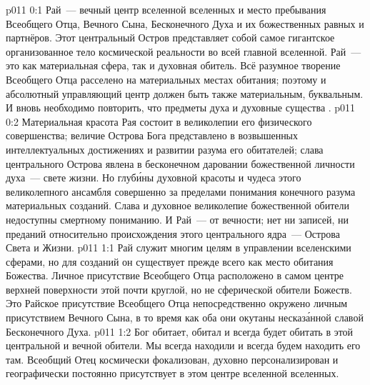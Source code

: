 \author{Совершенствователь Мудрости}
\vs p011 0:1 Рай~--- вечный центр вселенной вселенных и место пребывания Всеобщего Отца, Вечного Сына, Бесконечного Духа и их божественных равных и партнёров. Этот центральный Остров представляет собой самое гигантское организованное тело космической реальности во всей главной вселенной. Рай~--- это как материальная сфера, так и духовная обитель. Всё разумное творение Всеобщего Отца расселено на материальных местах обитания; поэтому и абсолютный управляющий центр должен быть также материальным, буквальным. И вновь необходимо повторить, что предметы духа и духовные существа .
\vs p011 0:2 Материальная красота Рая состоит в великолепии его физического совершенства; величие Острова Бога представлено в возвышенных интеллектуальных достижениях и развитии разума его обитателей; слава центрального Острова явлена в бесконечном даровании божественной личности духа~--- свете жизни. Но глуб\'ины духовной красоты и чудеса этого великолепного ансамбля совершенно за пределами понимания конечного разума материальных созданий. Слава и духовное великолепие божественной обители недоступны смертному пониманию. И Рай~--- от вечности; нет ни записей, ни преданий относительно происхождения этого центрального ядра~--- Острова Света и Жизни.
\vs p011 1:1 Рай служит многим целям в управлении вселенскими сферами, но для созданий он существует прежде всего как место обитания Божества. Личное присутствие Всеобщего Отца расположено в самом центре верхней поверхности этой почти круглой, но не сферической обители Божеств. Это Райское присутствие Всеобщего Отца непосредственно окружено личным присутствием Вечного Сына, в то время как оба они окутаны несказ\'анной славой Бесконечного Духа.
\vs p011 1:2 Бог обитает, обитал и всегда будет обитать в этой центральной и вечной обители. Мы всегда находили и всегда будем находить его там. Всеобщий Отец космически фокализован, духовно персонализирован и географически постоянно присутствует в этом центре вселенной вселенных.
